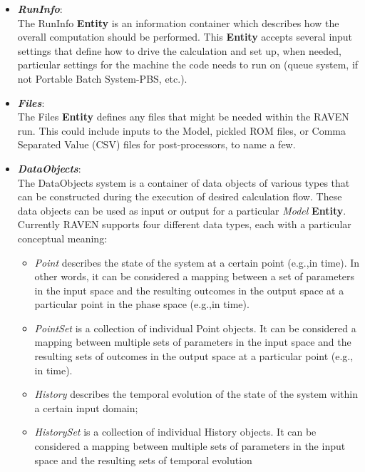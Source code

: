 \begin{itemize}
  \item \textit{\textbf{RunInfo}}:
    \\The RunInfo \textbf{Entity} is an information container which describes how the overall computation should
      be performed. This \textbf{Entity}  accepts several input settings that define how to drive the calculation and set up,
      when needed, particular settings for the machine the code needs to run on (queue system, if not Portable Batch System-PBS, etc.).
  \item \textit{\textbf{Files}}:
  \\ The Files \textbf{Entity}  defines any files that might be needed within the RAVEN run. This could include inputs to the
      Model, pickled ROM files, or Comma Separated Value (CSV) files for post-processors, to name a few.
  \item \textit{\textbf{DataObjects}}:
    \\The DataObjects system is a container of data objects of various types that can be constructed during the execution of
    desired calculation flow. These data objects can be used as input or output for a particular \textit{Model}
     \textbf{Entity}. Currently RAVEN supports four different data types, each with a particular conceptual meaning:
     \begin{itemize}
        \item \textit{Point} describes the state of the system at a certain point (e.g.,in time). In other words, it can be
                                       considered a mapping between a set of parameters in the input space and the resulting
                                       outcomes in the output space at a particular point in the phase space (e.g.,in time).
        \item \textit{PointSet} is a collection of individual Point objects. It can be considered a mapping between multiple
                                            sets of parameters in the input space and the resulting sets of outcomes in the output space
                                            at a particular point (e.g., in time).
        \item \textit{History} describes the temporal evolution of the state of the system within a certain input domain;
        \item \textit{HistorySet} is a collection of individual History objects. It can be considered a mapping between
                                               multiple sets of parameters in the input space and the resulting sets of temporal evolution

\end{itemize}
\end{itemize}
